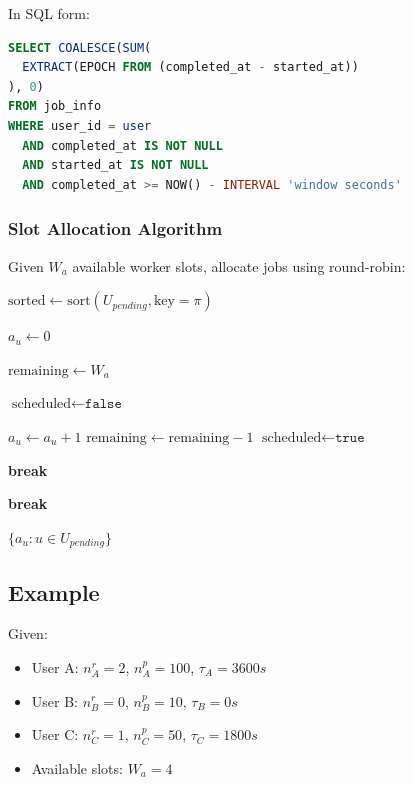 \documentclass[11pt]{article}
\begin{document}
In SQL form:
\begin{lstlisting}[language=SQL, numbers=none]
SELECT COALESCE(SUM(
  EXTRACT(EPOCH FROM (completed_at - started_at))
), 0)
FROM job_info
WHERE user_id = user
  AND completed_at IS NOT NULL
  AND started_at IS NOT NULL
  AND completed_at >= NOW() - INTERVAL 'window seconds'
\end{lstlisting}

\subsubsection{Slot Allocation Algorithm}

Given $W_a$ available worker slots, allocate jobs using round-robin:

\begin{algorithm}[H]
\caption{Fair Slot Allocation}
\begin{algorithmic}[1]
  \State $\text{sorted} \gets \text{sort}(U_{pending}, \text{key}=\pi)$

    \State $a_u \gets 0$ 
  \EndFor

  \State $\text{remaining} \gets W_a$

    \State $\text{scheduled} \gets \texttt{false}$

        \State $a_u \gets a_u + 1$
        \State $\text{remaining} \gets \text{remaining} - 1$
        \State $\text{scheduled} \gets \texttt{true}$

          \State \textbf{break}
        \EndIf
      \EndIf
    \EndFor

      \State \textbf{break}
    \EndIf
  \EndWhile

  \State \Return $\{a_u : u \in U_{pending}\}$
\EndProcedure
\end{algorithmic}
\end{algorithm}

\subsection{Example}

Given:
\begin{itemize}
\item User A: $n_A^r = 2$, $n_A^p = 100$, $\tau_A = 3600s$
\item User B: $n_B^r = 0$, $n_B^p = 10$, $\tau_B = 0s$
\item User C: $n_C^r = 1$, $n_C^p = 50$, $\tau_C = 1800s$
\item Available slots: $W_a = 4$
\end{itemize}
\end{document}
